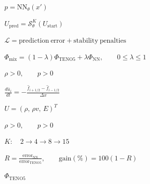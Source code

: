 \documentclass{article}
\begin{document}
\begin{preview}
\hbox{
\color[HTML]{242424}
\fontsize{25}{30.00}\selectfont
$\displaystyle p=\mathrm{NN}_{\theta}(x')$
}
\end{preview}
\begin{preview}
\hbox{
\color[HTML]{242424}
\fontsize{27}{32.40}\selectfont
$\displaystyle U_{\mathrm{pred}}=\mathcal{S}_{\theta}^{K}(U_{\mathrm{start}})$
}
\end{preview}
\begin{preview}
\hbox{
\color[HTML]{242424}
\fontsize{27}{32.40}\selectfont
$\displaystyle \mathcal{L}=\mathrm{prediction\ error}+\mathrm{stability\ penalties}$
}
\end{preview}
\begin{preview}
\hbox{
\color[HTML]{242424}
\fontsize{28}{33.60}\selectfont
$\displaystyle \Phi_{\mathrm{mix}}=(1-\lambda)\Phi_{\mathrm{TENO5}}+\lambda\Phi_{\mathrm{NN}},\qquad 0\leq\lambda\leq1$
}
\end{preview}
\begin{preview}
\hbox{
\color[HTML]{242424}
\fontsize{28}{33.60}\selectfont
$\displaystyle \rho>0,\qquad p>0$
}
\end{preview}
\begin{preview}
\hbox{
\color[HTML]{242424}
\fontsize{26}{31.20}\selectfont
$\displaystyle \frac{d\bar u_i}{dt}=-\frac{\hat f_{i+1/2}-\hat f_{i-1/2}}{\Delta x}$
}
\end{preview}
\begin{preview}
\hbox{
\color[HTML]{242424}
\fontsize{30}{36.00}\selectfont
$\displaystyle U=(\rho,\,\rho v,\,E)^{T}$
}
\end{preview}
\begin{preview}
\hbox{
\color[HTML]{242424}
\fontsize{30}{36.00}\selectfont
$\displaystyle \rho>0,\qquad p>0$
}
\end{preview}
\begin{preview}
\hbox{
\color[HTML]{242424}
\fontsize{25}{30.00}\selectfont
$\displaystyle K:\quad 2\longrightarrow4\longrightarrow8\longrightarrow15$
}
\end{preview}
\begin{preview}
\hbox{
\color[HTML]{242424}
\fontsize{24}{28.80}\selectfont
$\displaystyle R=\frac{\mathrm{error}_{\mathrm{NN}}}{\mathrm{error}_{\mathrm{TENO5}}},\qquad \mathrm{gain}(\%)=100(1-R)$
}
\end{preview}
\begin{preview}
\hbox{
\color[HTML]{242424}
\fontsize{25}{30.00}\selectfont
$\displaystyle \Phi_{\mathrm{TENO5}}$
}
\end{preview}
\end{document}
